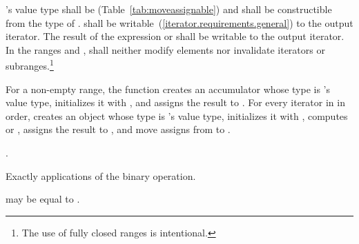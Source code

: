 \documentclass[ebook,11pt,article]{memoir}
\begin{document}
\begin{itemdescr}
\pnum
\requires
{}'s value type shall be  (Table~\ref{tab:moveassignable})
and shall be constructible from the type of .  shall be
writable~(\ref{iterator.requirements.general}) to the  output iterator. The result of the expression \added{\tcode{)}}
or \added{\tcode{)}}\tcode{)} shall be writable to the  output iterator.
In the ranges
and
,
shall neither modify elements nor invalidate iterators or
subranges.\footnote{The use of fully closed ranges is intentional.}

\pnum
\effects For a non-empty range,
the function creates an accumulator  whose type is 's
value type, initializes it with ,
and assigns the result to . For every iterator  in 
in order, creates an object  whose type is 's value type, initializes it
with , computes \added{\tcode{)}}\tcode{} 
or \added{\tcode{)}}\tcode{)}, assigns the result
to , and move assigns from  to .

\pnum
\returns
{}.

\pnum
\complexity
Exactly
applications of
the binary operation.

\pnum
\remarks
{}
may be equal to
.
\end{itemdescr}
\end{document}
